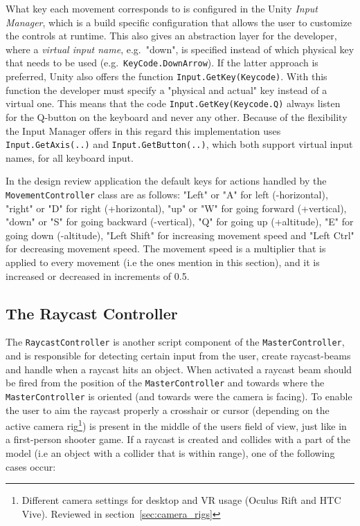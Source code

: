 What key each movement corresponds to is configured in the Unity \textit{Input Manager}, which is a build specific configuration that allows the user to customize the 
controls at runtime. This also gives an abstraction layer for the developer, where a \textit{virtual input name}, e.g.~"down", is specified instead of which physical key that needs to be 
used (e.g.~\texttt{KeyCode.\-DownArrow}). If the latter approach is preferred, Unity also offers the function \texttt{Input.\-GetKey(\-Keycode)}. 
With this function the developer must specify a "physical and actual" key instead of a virtual one. 
This means that the code \texttt{Input.\-GetKey(\-Keycode.Q)} always listen for the Q-button on the keyboard and never any other. 
Because of the flexibility the Input Manager offers in this regard this implementation uses \texttt{Input.\-GetAxis(..)} and \texttt{Input.\-GetButton(..)}, 
which both support virtual input names, for all keyboard input.

In the design review application the default keys for actions handled by the \texttt{Movement\-Controller} class are as follows:
"Left" or "A" for left (-horizontal), "right" or "D" for right (+horizontal), "up" or "W" for going forward (+vertical), 
"down" or "S" for going backward (-vertical), "Q" for going up (+altitude), "E" for going down (-altitude), "Left Shift" for increasing movement speed and
"Left Ctrl" for decreasing movement speed. The movement speed is a multiplier that is applied to every movement (i.e the ones mention in this section),
and it is increased or decreased in increments of 0.5.  

%  

\subsection{The Raycast Controller}
The \texttt{Raycast\-Controller} is another script component of the \texttt{Master\-Controller}, and is responsible for detecting certain input from the user, create raycast-beams 
and handle when a raycast hits an object. When activated a raycast beam should be fired from the position of the \texttt{Master\-Controller} and towards where the 
\texttt{Master\-Controller} is oriented (and towards were the camera is facing). To enable the user to aim the raycast properly a crosshair or cursor (depending on the 
active camera rig\footnote{Different camera settings for desktop and VR usage (Oculus Rift and HTC Vive). Reviewed in section~\vref{sec:camera_rigs}}) 
is present in the middle of the users field of view, just like in a first-person shooter game. 
If a raycast is created and collides with a part of the model (i.e an object with a collider that is within range), one of the following cases occur:

